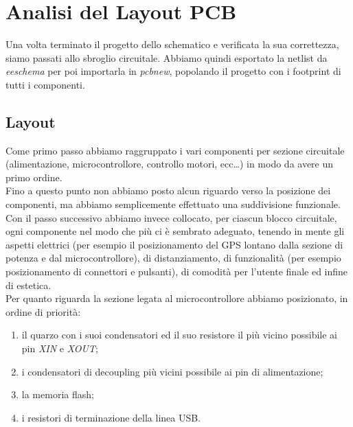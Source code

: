 \chapter{Analisi del Layout PCB}

Una volta terminato il progetto dello schematico e verificata la sua
correttezza, siamo passati allo sbroglio circuitale. Abbiamo quindi
esportato la netlist da \emph{eeschema} per poi importarla in
\emph{pcbnew}, popolando il progetto con i footprint di tutti i
componenti.

\hypertarget{layout}{%
\section{Layout}\label{layout}}

Come primo passo abbiamo raggruppato i vari componenti per sezione
circuitale (alimentazione, microcontrollore, controllo motori,
ecc\ldots) in modo da avere un primo ordine.\\
Fino a questo punto non abbiamo posto alcun riguardo verso la posizione
dei componenti, ma abbiamo semplicemente effettuato una suddivisione
funzionale. Con il passo successivo abbiamo invece collocato, per
ciascun blocco circuitale, ogni componente nel modo che più ci è
sembrato adeguato, tenendo in mente gli aspetti elettrici (per esempio
il posizionamento del GPS lontano dalla sezione di potenza e dal
microcontrollore), di distanziamento, di funzionalità (per esempio
posizionamento di connettori e pulsanti), di comodità per l'utente
finale ed infine di estetica.\\
Per quanto riguarda la sezione legata al microcontrollore abbiamo
posizionato, in ordine di priorità:

\begin{enumerate}
\def\labelenumi{\arabic{enumi}.}
\item
  
  il quarzo con i suoi condensatori ed il suo resistore il più vicino
  possibile ai pin \textit{XIN} e \textit{XOUT};
  
\item
  
  i condensatori di decoupling più vicini possibile ai pin di
  alimentazione;
  
\item
  
  la memoria flash;
  
\item
  
  i resistori di terminazione della linea USB.
  
\end{enumerate}

